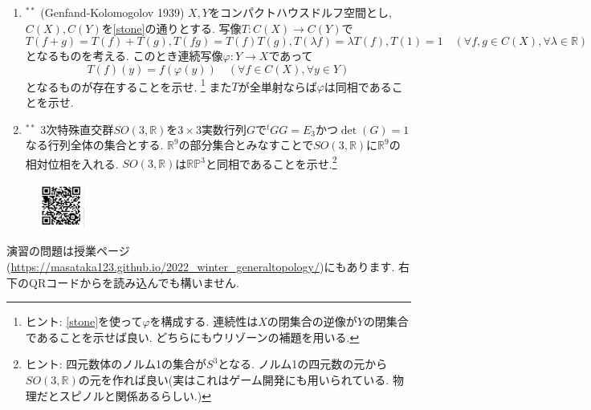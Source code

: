 \documentclass[dvipdfmx,a4paper,11pt]{article}
\newcommand{\R}{\mathbb{R}}
\theoremstyle{definition}
\begin{document}
\begin{enumerate}[label=\textbf{問}8.\arabic*]
\item $^{**}$\label{Gelfand} (Genfand-Kolomogolov 1939) $X,Y$をコンパクトハウスドルフ空間とし, $C(X), C(Y)$を\ref{stone}の通りとする.
写像$T : C(X) \rightarrow C(Y)$で
$$
T(f + g) = T(f) + T(g), T(fg)=T(f)T(g), T(\lambda f) = \lambda T(f), T(1) =1 \quad (\forall f,g \in C(X), \forall \lambda \in \R)
$$
となるものを考える.%
このとき連続写像$\varphi : Y \rightarrow X$であって
$$
T(f)(y) = f(\varphi(y)) \quad  (\forall f\in C(X), \forall y \in Y)
$$
となるものが存在することを示せ. \footnote{ヒント: \ref{stone}を使って$\varphi$を構成する. 連続性は$X$の閉集合の逆像が$Y$の閉集合であることを示せば良い. どちらにもウリゾーンの補題を用いる. }
また$T$が全単射ならば$\varphi$は同相であることを示せ.

 
\item \label{so3} $^{**}$ 3次特殊直交群$SO(3,\R)$を$ 3\times 3$実数行列$G$で$^{t}GG=E_3$かつ$\det(G)=1$なる行列全体の集合とする. $\R^{9}$の部分集合とみなすことで$SO(3,\R)$に$\R^{9}$の相対位相を入れる. 
$SO(3,\R)$は$\R\mathbb{P}^{3}$と同相であることを示せ.\footnote{ヒント: 四元数体のノルム1の集合が$S^3$となる. ノルム1の四元数の元から$SO(3,\R)$の元を作れば良い(実はこれはゲーム開発にも用いられている. 物理だとスピノルと関係あるらしい.)}

 \end{enumerate}

 \vspace{11pt}
\begin{figure}
  \centering
 \includegraphics[height=15mm, width=15mm]{genetopo.png}
\end{figure}


演習の問題は授業ページ(\url{https://masataka123.github.io/2022_winter_generaltopology/})にもあります. 
右下のQRコードからを読み込んでも構いません.
\end{document}
